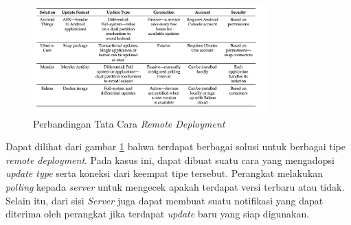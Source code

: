 \begin{figure}[ht]
  \centering
  \includegraphics[width=0.8\textwidth]{resources/chapter-2/perbandingan-remote-deployment.jpg}
  \caption{Perbandingan Tata Cara \textit{Remote Deployment} \parencite{RemoteDeployment}}
  \label{fig:comparison-remote-deployments}
\end{figure}

Dapat dilihat dari gambar \ref{fig:comparison-remote-deployments} bahwa terdapat berbagai solusi untuk berbagai tipe \textit{remote deployment}. Pada kasus ini, dapat dibuat suatu cara yang mengadopsi \textit{update type} serta koneksi dari keempat tipe tersebut. Perangkat melakukan \textit{polling} kepada \textit{server} untuk mengecek apakah terdapat versi terbaru atau tidak. Selain itu, dari sisi \textit{Server} juga dapat membuat suatu notifikasi yang dapat diterima oleh perangkat jika terdapat \textit{update} baru yang siap digunakan.
